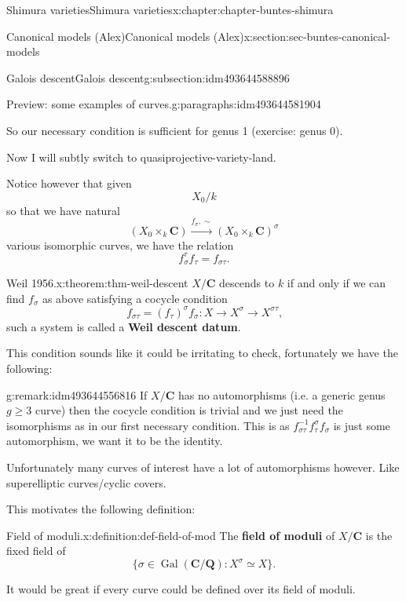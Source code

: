 \documentclass[oneside,10pt,]{book}
\newcommand{\terminology}[1]{\textbf{#1}}
\numberwithin{equation}{section}
\newcommand{\inv}{^{-1}}
\newcommand{\QQ}{\mathbf{Q}}
\newcommand{\CC}{\mathbf{C}}
\newcommand{\Gal}[2]{\operatorname{Gal}(#1/#2)}
\begin{document}
\begin{chapterptx}{Shimura varieties}{}{Shimura varieties}{}{}{x:chapter:chapter-buntes-shimura}
\begin{sectionptx}{Canonical models (Alex)}{}{Canonical models (Alex)}{}{}{x:section:sec-buntes-canonical-models}
\begin{subsectionptx}{Galois descent}{}{Galois descent}{}{}{g:subsection:idm493644588896}
\begin{paragraphs}{Preview: some examples of curves.}{g:paragraphs:idm493644581904}
\par
So our necessary condition is sufficient for genus 1 (exercise: genus 0).%
\end{paragraphs}%
\par
Now I will subtly switch to quasiprojective-variety-land.%
\par
Notice however that given%
\begin{equation*}
X_0/k
\end{equation*}
so that we have natural%
\begin{equation*}
(X_0 \times_k \CC) \xrightarrow{f_\sigma,\sim} (X_0 \times_k \CC)^\sigma
\end{equation*}
various isomorphic curves, we have the relation%
\begin{equation*}
f_\sigma^\tau f_\tau = f_{\sigma\tau}\text{.}
\end{equation*}
%
\begin{theorem}{Weil 1956.}{}{x:theorem:thm-weil-descent}%
\(X/\CC\) descends to \(k\) if and only if we can find \(f_\sigma\) as above satisfying a cocycle condition%
\begin{equation*}
f_{\sigma\tau} = (f_\tau)^\sigma f_\sigma\colon X \to X^\sigma \to X^{\sigma\tau}\text{,}
\end{equation*}
such a system is called a \terminology{Weil descent datum}.%
\end{theorem}
This condition sounds like it could be irritating to check, fortunately we have the following:%
\begin{remark}{}{g:remark:idm493644556816}%
If \(X/\CC\) has no automorphisms (i.e. a generic genus \(g \ge 3\) curve) then the cocycle condition is trivial and we just need the isomorphisms as in our first necessary condition. This is as \(f_{\sigma\tau}\inv f_\tau ^\sigma f_\sigma\) is just some automorphism, we want it to be the identity.%
\par
Unfortunately many curves of interest have a lot of automorphisms however. Like superelliptic curves\slash{}cyclic covers.%
\end{remark}
This motivates the following definition:%
\begin{definition}{Field of moduli.}{x:definition:def-field-of-mod}%
The \terminology{field of moduli} of \(X/\CC\) is the fixed field of%
\begin{equation*}
\{\sigma \in \Gal{\CC}{\QQ} : X^\sigma \simeq X\}\text{.}
\end{equation*}
%
\end{definition}
It would be great if every curve could be defined over its field of moduli.%

\end{subsectionptx}
\end{sectionptx}
\end{chapterptx}
\end{document}
